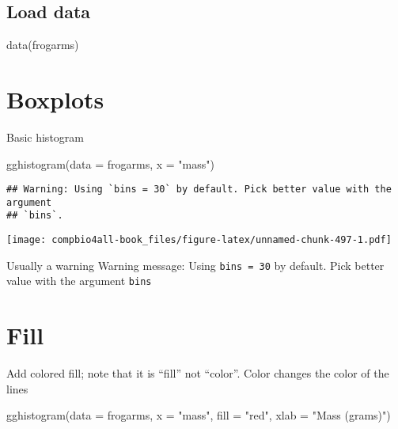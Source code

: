 \documentclass[
]{book}
\newenvironment{Shaded}{\begin{snugshade}}{\end{snugshade}}
\newcommand{\AttributeTok}[1]{\textcolor[rgb]{0.77,0.63,0.00}{#1}}
\newcommand{\FunctionTok}[1]{\textcolor[rgb]{0.00,0.00,0.00}{#1}}
\newcommand{\NormalTok}[1]{#1}
\newcommand{\StringTok}[1]{\textcolor[rgb]{0.31,0.60,0.02}{#1}}
\begin{document}
\hypertarget{load-data-4}{%
\subsection{Load data}\label{load-data-4}}

\begin{Shaded}
\begin{Highlighting}[]
\FunctionTok{data}\NormalTok{(frogarms)}
\end{Highlighting}
\end{Shaded}

\hypertarget{boxplots-4}{%
\section{Boxplots}\label{boxplots-4}}

Basic histogram

\begin{Shaded}
\begin{Highlighting}[]
\FunctionTok{gghistogram}\NormalTok{(}\AttributeTok{data =}\NormalTok{ frogarms,}
            \AttributeTok{x =} \StringTok{"mass"}\NormalTok{)}
\end{Highlighting}
\end{Shaded}

\begin{verbatim}
## Warning: Using `bins = 30` by default. Pick better value with the argument
## `bins`.
\end{verbatim}

\texttt{[image: compbio4all-book\_files/figure-latex/unnamed-chunk-497-1.pdf]}

Usually a warning
Warning message:
Using \texttt{bins\ =\ 30} by default. Pick better value with the argument \texttt{bins}

\hypertarget{fill-2}{%
\section{Fill}\label{fill-2}}

Add colored fill; note that it is ``fill'' not ``color''. Color changes the color of the lines

\begin{Shaded}
\begin{Highlighting}[]
\FunctionTok{gghistogram}\NormalTok{(}\AttributeTok{data =}\NormalTok{ frogarms,}
            \AttributeTok{x =} \StringTok{"mass"}\NormalTok{,}
            \AttributeTok{fill =} \StringTok{"red"}\NormalTok{,}
            \AttributeTok{xlab =} \StringTok{"Mass (grams)"}\NormalTok{)}
\end{Highlighting}
\end{Shaded}
\end{document}
